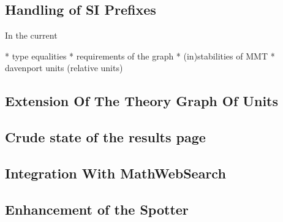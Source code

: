 \subsection{Handling of SI Prefixes}
In the current

* type equalities
* requirements of the graph
* (in)stabilities of MMT
* davenport units (relative units)

\subsection{Extension Of The Theory Graph Of Units}
\subsection{Crude state of the results page}
\label{sec:fut_res}
\subsection{Integration With MathWebSearch}
\subsection{Enhancement of the Spotter}
